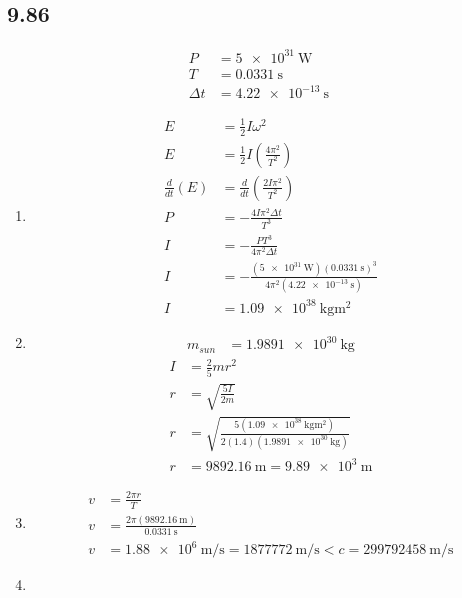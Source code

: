 \documentclass{article}
\begin{document}
\subsection{9.86}

\begin{align*}
	P & = \SI{5e31}{\watt} \\
	T & = \SI{0.0331}{\second} \\
	\Delta t & = \SI{4.22e-13}{\second}
\end{align*}
\begin{enumerate}[label = \boldalpha]
	\item
		\begin{align*}
			E & = \frac{1}{2}I\omega^2 \\
			E & = \frac{1}{2}I\left( \frac{ 4\pi^2 }{ T^2 } \right) \\
			\frac{d}{dt}(E) & = \frac{d}{dt} \left( \frac{ 2I\pi^2 }{ T^2 } \right) \\
			P & = -\frac{ 4I\pi^2\Delta t }{ T^3 } \\
			I & = -\frac{ PT^3 }{ 4\pi^2\Delta t } \\
			I & = -\frac{ (\SI{5e31}{\watt})(\SI{0.0331}{\second})^3 }{ 4\pi^2(\SI{4.22e-13}{\second}) } \\
			I & = \SI{1.09e38}{\kilogram \meter \squared}
		\end{align*}
	\item
		\begin{align*}
			m_{sun} & = \SI{1.9891e30}{\kilogram}
		\end{align*}
		\begin{align*}
			I & = \frac{2}{5}mr^2 \\
			r & = \sqrt{ \frac{ 5I }{ 2m } } \\
			r & = \sqrt {\frac{ 5(\SI{1.09e38}{\kilogram \meter \squared}) }{ 2(1.4)(\SI{1.9891e30}{\kilogram}) } } \\
			r & = \SI{9892.16}{\meter} = \SI{9.89e3}{\meter}
		\end{align*}
	\item
		\begin{align*}
			v & = \frac{ 2\pi r }{ T } \\
			v & = \frac{ 2\pi (\SI{9892.16}{\meter}) }{ \SI{0.0331}{\second} } \\
			v & = \SI{1.88e6}{\meter \per \second} = \SI{1877772}{\meter \per \second} < c = \SI{299792458}{\meter \per \second}
		\end{align*}
	\item
		\begin{align*}

\end{align*}
\end{enumerate}
\end{document}
